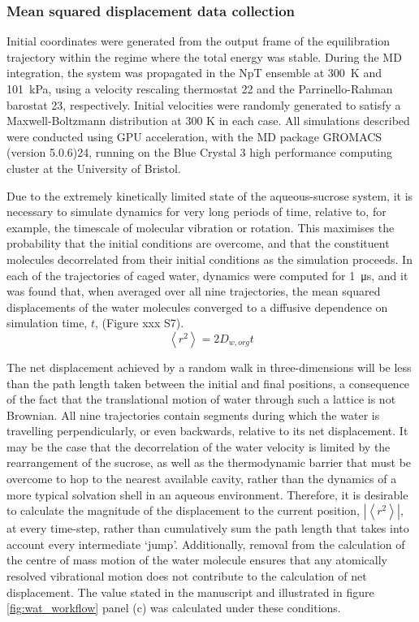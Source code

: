 \subsubsection{Mean squared displacement data collection}
Initial coordinates were generated from the output frame of the equilibration trajectory within the regime where the total energy was stable. During the MD integration, the system was propagated in the NpT ensemble at \SI{300}{\kelvin} and \SI{101}{\kilo\pascal}, using a velocity rescaling thermostat 22 and the Parrinello-Rahman barostat 23, respectively. Initial velocities were randomly generated to satisfy a Maxwell-Boltzmann distribution at 300 K in each case. All simulations described were conducted using GPU acceleration, with the MD package GROMACS (version 5.0.6)24, running on the Blue Crystal 3 high performance computing cluster at the University of Bristol.

Due to the extremely kinetically limited state of the aqueous-sucrose system, it is necessary to simulate dynamics for very long periods of time, relative to, for example, the timescale of molecular vibration or rotation. This maximises the probability that the initial conditions are overcome, and that the constituent molecules decorrelated from their initial conditions as the simulation proceeds. In each of the trajectories of caged water, dynamics were computed for \SI{1}{\micro\second}, and it was found that, when averaged over all nine trajectories, the mean squared displacements of the water molecules converged to a diffusive dependence on simulation time, $t$, (Figure xxx S7).
\begin{equation}\label{eqn:wat_msd}
\left\langle r^{2}\right\rangle=2 D_{w, org} t
\end{equation}

The net displacement achieved by a random walk in three-dimensions will be less than the path length taken between the initial and final positions, a consequence of the fact that the translational motion of water through such a lattice is not Brownian. All nine trajectories contain segments during which the water is travelling perpendicularly, or even backwards, relative to its net displacement. It may be the case that the decorrelation of the water velocity is limited by the rearrangement of the sucrose, as well as the thermodynamic barrier that must be overcome to hop to the nearest available cavity, rather than the dynamics of a more typical solvation shell in an aqueous environment. Therefore, it is desirable to calculate the magnitude of the displacement to the current position, $\left|\left\langle r^{2}\right\rangle\right|$, at every time-step, rather than cumulatively sum the path length that takes into account every intermediate `jump’. Additionally, removal from the calculation of the centre of mass motion of the water molecule ensures that any atomically resolved vibrational motion does not contribute to the calculation of net displacement. The value stated in the manuscript and illustrated in figure \ref{fig:wat_workflow} panel (c) was calculated under these conditions. 

